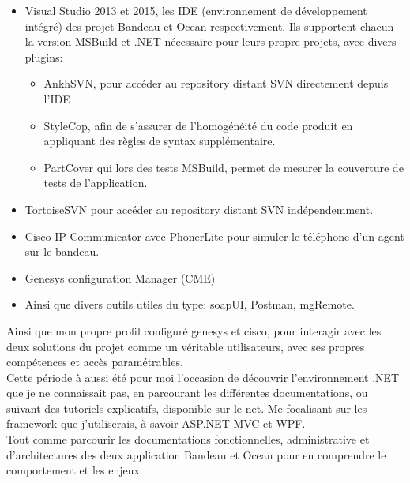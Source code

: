 \documentclass{rapport}
\begin{document}
\begin{itemize}
  \item Visual Studio 2013 et 2015, les IDE (environnement de développement intégré) des projet Bandeau et Ocean respectivement. Ils supportent chacun la version MSBuild et .NET nécessaire pour leurs propre projets, avec divers plugins:
  
    \begin{itemize}
        \item AnkhSVN, pour accéder au repository distant SVN directement depuis l'IDE
  
        \item StyleCop, afin de s'assurer de l'homogénéité du code produit en appliquant des règles de syntax supplémentaire.
  
        \item PartCover qui lors des tests MSBuild, permet de mesurer la couverture de tests de l'application.
    \end{itemize}

  \item TortoiseSVN pour accéder au repository distant SVN indépendemment.
  
  \item Cisco IP Communicator avec PhonerLite pour simuler le téléphone d'un agent sur le bandeau.
  
  \item Genesys configuration Manager (CME)
  
  \item Ainsi que divers outils utiles du type: soapUI, Postman, mgRemote.
  
\end{itemize}

Ainsi que mon propre profil configuré genesys et cisco, pour interagir avec les deux solutions du projet comme un véritable utilisateurs, avec ses propres compétences et accès paramétrables.\\

Cette période à aussi été pour moi l'occasion de découvrir l'environnement .NET que je ne connaissait pas, en parcourant les différentes documentations, ou suivant des tutoriels explicatifs, disponible sur le net. Me focalisant sur les framework que j'utiliserais, à savoir ASP.NET MVC et WPF.\\
Tout comme parcourir les documentations fonctionnelles, administrative et d'architectures des deux application Bandeau et Ocean pour en comprendre le comportement et les enjeux.\\
\end{document}
